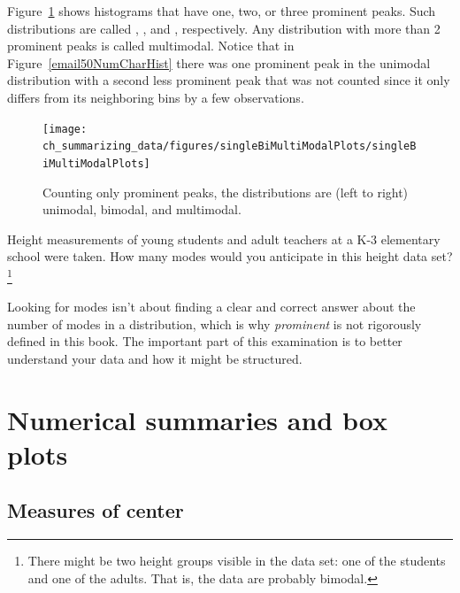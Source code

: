 Figure~\ref{singleBiMultiModalPlots} shows histograms that have one, two, or three prominent peaks. Such distributions are called , , and , respectively. Any distribution with more than 2 prominent peaks is called multimodal. Notice that in Figure~\ref{email50NumCharHist} there was one prominent peak in the unimodal distribution with a second less prominent peak that was not counted since it only differs from its neighboring bins by a few observations.

\begin{figure}[h]
   \centering
   \texttt{[image: ch\_summarizing\_data/figures/singleBiMultiModalPlots/singleBiMultiModalPlots]}
   \caption{Counting only prominent peaks, the distributions are (left to right) unimodal, bimodal, and multimodal.}
   \label{singleBiMultiModalPlots}
\end{figure}

\begin{exercise}
Height measurements of young students and adult teachers at a K-3 elementary school were taken. How many modes would you anticipate in this height data set?\footnote{There might be two height groups visible in the data set: one of the students and one of the adults. That is, the data are probably bimodal.}
\end{exercise}

\begin{tipBox}{
Looking for modes isn't about finding a clear and correct answer about the number of modes in a distribution, which is why \emph{prominent} is not rigorously defined in this book. The important part of this examination is to better understand your data and how it might be structured.}
\end{tipBox}


\section[Numerical summaries and box plots]{Numerical summaries and box plots }
\label{numericalSummariesAndBoxPlots}

\subsection{Measures of center}
\label{center}

